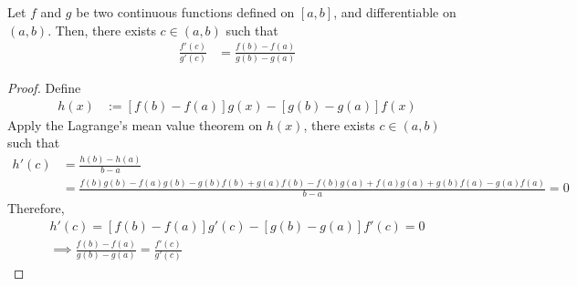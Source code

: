 \documentclass[11pt]{article}
\begin{document}
	\begin{theorem}
		Let $f$ and $g$ be two continuous functions defined on $[a, b]$, and differentiable on $(a, b)$. Then, there exists $c \in (a, b)$ such that
		\begin{align}
			\frac{f'(c)}{g'(c)} &= \frac{f(b) - f(a)}{g(b) - g(a)}
		\end{align}
	\end{theorem}
	
	\begin{proof}
		Define 
		\begin{align}
			h(x) &:= [f(b) - f(a)] g(x) - [g(b) - g(a)] f(x)
		\end{align}
		Apply the Lagrange's mean value theorem on $h(x)$, there exists $c \in (a, b)$ such that
		\begin{align}
			h'(c) &= \frac{h(b)-h(a)}{b-a} \\
			&= \frac{f(b)g(b) - f(a)g(b) - g(b)f(b) + g(a) f(b) - f(b)g(a) + f(a)g(a) + g(b)f(a) - g(a)f(a)}{b-a} = 0
		\end{align}
		Therefore,
		\begin{align}
			h'(c) = [f(b) - f(a)]g'(c) - [g(b) - g(a)]f'(c) = 0 \\
			\implies \frac{f(b) - f(a)}{g(b) - g(a)} = \frac{f'(c)}{g'(c)}
		\end{align}
	\end{proof}
	
\end{document}
